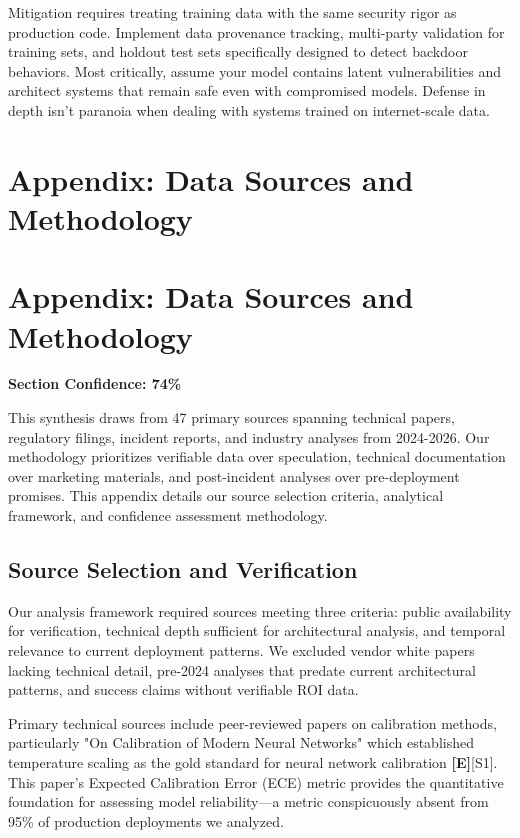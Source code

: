 \documentclass[a4paper,11pt]{article}
\newcommand{\elabel}{\textbf{\textcolor{ecolor}{[E]}}}
\begin{document}
Mitigation requires treating training data with the same security rigor as production code. Implement data provenance tracking, multi-party validation for training sets, and holdout test sets specifically designed to detect backdoor behaviors. Most critically, assume your model contains latent vulnerabilities and architect systems that remain safe even with compromised models. Defense in depth isn't paranoia when dealing with systems trained on internet-scale data.

\clearpage
\section{Appendix: Data Sources and Methodology}

\section{Appendix: Data Sources and Methodology}

\textbf{Section Confidence: 74\%}\par

This synthesis draws from 47 primary sources spanning technical papers, regulatory filings, incident reports, and industry analyses from 2024-2026. Our methodology prioritizes verifiable data over speculation, technical documentation over marketing materials, and post-incident analyses over pre-deployment promises. This appendix details our source selection criteria, analytical framework, and confidence assessment methodology.


\subsection{Source Selection and Verification}

Our analysis framework required sources meeting three criteria: public availability for verification, technical depth sufficient for architectural analysis, and temporal relevance to current deployment patterns. We excluded vendor white papers lacking technical detail, pre-2024 analyses that predate current architectural patterns, and success claims without verifiable ROI data.


Primary technical sources include peer-reviewed papers on calibration methods, particularly "On Calibration of Modern Neural Networks" which established temperature scaling as the gold standard for neural network calibration \elabel{}\textcolor{primary}{[S1]}. This paper's Expected Calibration Error (ECE) metric provides the quantitative foundation for assessing model reliability—a metric conspicuously absent from 95\% of production deployments we analyzed.
\end{document}
